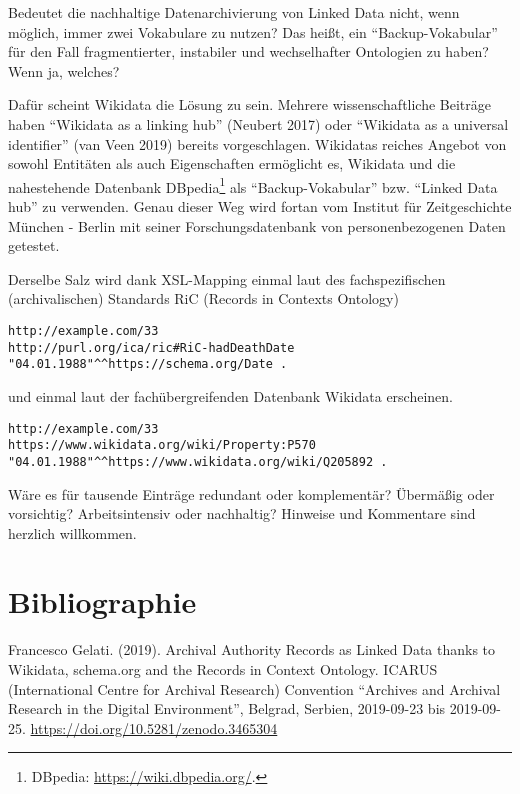 \documentclass[a4paper,
fontsize=11pt,
oneside,
numbers=noperiodatend,
parskip=half-,
bibliography=totoc,
final
]{scrartcl}
\begin{document}
Bedeutet die nachhaltige Datenarchivierung von Linked Data nicht, wenn
möglich, immer zwei Vokabulare zu nutzen? Das heißt, ein
\enquote{Backup-Vokabular} für den Fall fragmentierter, instabiler und
wechselhafter Ontologien zu haben? Wenn ja, welches?

Dafür scheint Wikidata die Lösung zu sein. Mehrere wissenschaftliche
Beiträge haben \enquote{Wikidata as a linking hub} (Neubert 2017) oder
\enquote{Wikidata as a universal identifier} (van Veen 2019) bereits
vorgeschlagen. Wikidatas reiches Angebot von sowohl Entitäten als auch
Eigenschaften ermöglicht es, Wikidata und die nahestehende Datenbank
DBpedia\footnote{DBpedia: \url{https://wiki.dbpedia.org/}.} als
\enquote{Backup-Vokabular} bzw. \enquote{Linked Data hub} zu verwenden.
Genau dieser Weg wird fortan vom Institut für Zeitgeschichte München -
Berlin mit seiner Forschungsdatenbank von personenbezogenen Daten
getestet.

Derselbe Salz wird dank XSL-Mapping einmal laut des fachspezifischen
(archivalischen) Standards RiC (Records in Contexts Ontology)

\begin{verbatim}
http://example.com/33
http://purl.org/ica/ric#RiC-hadDeathDate
"04.01.1988"^^https://schema.org/Date .
\end{verbatim}

und einmal laut der fachübergreifenden Datenbank Wikidata erscheinen.

\begin{verbatim}
http://example.com/33
https://www.wikidata.org/wiki/Property:P570
"04.01.1988"^^https://www.wikidata.org/wiki/Q205892 .
\end{verbatim}

Wäre es für tausende Einträge redundant oder komplementär? Übermäßig
oder vorsichtig? Arbeitsintensiv oder nachhaltig? Hinweise und
Kommentare sind herzlich willkommen.

\hypertarget{bibliographie}{%
\section{Bibliographie}\label{bibliographie}}

Francesco Gelati. (2019). Archival Authority Records as Linked Data
thanks to Wikidata, schema.org and the Records in Context Ontology.
ICARUS (International Centre for Archival Research) Convention
\enquote{Archives and Archival Research in the Digital Environment},
Belgrad, Serbien, 2019-09-23 bis 2019-09-25.
\url{https://doi.org/10.5281/zenodo.3465304}
\end{document}
